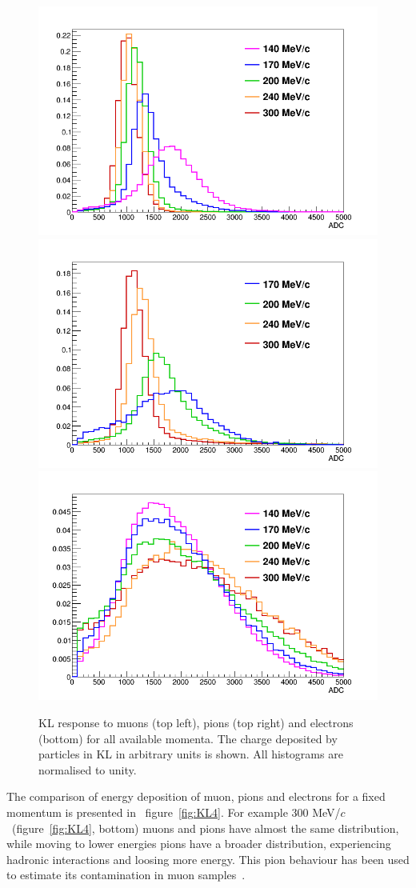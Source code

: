   \begin{figure}[htb!]
	\begin{center}
  		\includegraphics[width=0.49\columnwidth]{./04-KL/Figures/muon.png}
  		\includegraphics[width=0.49\columnwidth]{./04-KL/Figures/pion.png}
  		\includegraphics[width=0.49\columnwidth]{./04-KL/Figures/electron.png}
  		\caption{KL response to muons (top left), pions (top right) and electrons (bottom) for all available momenta. The charge deposited by particles in KL in arbitrary units is shown. All histograms are normalised to unity.}
  		\label{fig:KL3}
  	\end{center}
  \end{figure}
  
The comparison of energy deposition of muon, pions and electrons for a fixed momentum is presented in ~figure~\ref{fig:KL4}. 
For example 300 MeV/$c$~(figure~\ref{fig:KL4}, bottom) muons and pions have almost the same distribution, while moving to lower energies pions have a broader distribution, experiencing hadronic interactions and loosing more energy.
This pion behaviour has been used to estimate its contamination in muon samples~\cite{2016JInst..11P3001A}. 

